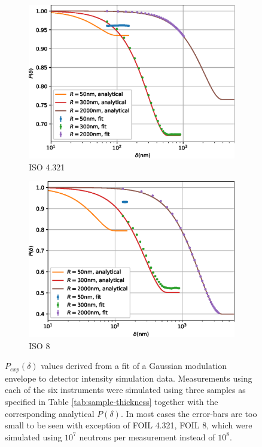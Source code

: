 \documentclass{article}
\begin{document}
\begin{figure}[p]
\begin{subfigure}[b]{0.45\textwidth}
		\includegraphics[width=\textwidth]{simulation-plot-gauss-ISO-4.321}
		\caption{ISO 4.321}
		\label{fig:simulation-plot-gauss-ISO-4.321}
	\end{subfigure}
	\hfill
	\begin{subfigure}[b]{0.45\textwidth}
		\centering
		\includegraphics[width=\textwidth]{simulation-plot-gauss-ISO-8}
		\caption{ISO 8}
		\label{fig:simulation-plot-gauss-ISO-8}
	\end{subfigure}
	\caption{$P_{exp}(\delta)$ values derived from a fit of a Gaussian modulation envelope to detector intensity simulation data. Measurements using each of the six instruments were simulated using three samples as specified in Table \ref{tab:sample-thickness} together with the corresponding analytical $P(\delta)$. In most cases the error-bars are too small to be seen with exception of FOIL 4.321, FOIL 8, which were simulated using $10^7$ neutrons per measurement instead of $10^8$.}
	\label{fig:simulation-plot-gauss}
\end{figure}
\end{document}
